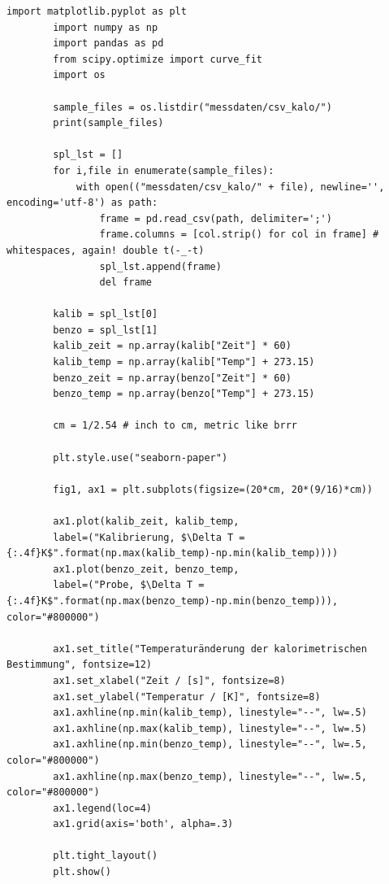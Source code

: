 	\begin{lstlisting}[style=python, caption={Zur Auswertung der kalorimetrischen Messung verwendeter Python-Code.}]
		import matplotlib.pyplot as plt
		import numpy as np
		import pandas as pd
		from scipy.optimize import curve_fit
		import os

		sample_files = os.listdir("messdaten/csv_kalo/")
		print(sample_files)

		spl_lst = []
		for i,file in enumerate(sample_files):
			with open(("messdaten/csv_kalo/" + file), newline='', encoding='utf-8') as path:
				frame = pd.read_csv(path, delimiter=';')
				frame.columns = [col.strip() for col in frame] # whitespaces, again! double t(-_-t)
				spl_lst.append(frame)
				del frame

		kalib = spl_lst[0]
		benzo = spl_lst[1]
		kalib_zeit = np.array(kalib["Zeit"] * 60)
		kalib_temp = np.array(kalib["Temp"] + 273.15)
		benzo_zeit = np.array(benzo["Zeit"] * 60)
		benzo_temp = np.array(benzo["Temp"] + 273.15)
		
		cm = 1/2.54 # inch to cm, metric like brrr

		plt.style.use("seaborn-paper")

		fig1, ax1 = plt.subplots(figsize=(20*cm, 20*(9/16)*cm))

		ax1.plot(kalib_zeit, kalib_temp,
		label=("Kalibrierung, $\Delta T = {:.4f}K$".format(np.max(kalib_temp)-np.min(kalib_temp))))
		ax1.plot(benzo_zeit, benzo_temp,
		label=("Probe, $\Delta T = {:.4f}K$".format(np.max(benzo_temp)-np.min(benzo_temp))), color="#800000")

		ax1.set_title("Temperaturänderung der kalorimetrischen Bestimmung", fontsize=12)
		ax1.set_xlabel("Zeit / [s]", fontsize=8)
		ax1.set_ylabel("Temperatur / [K]", fontsize=8)
		ax1.axhline(np.min(kalib_temp), linestyle="--", lw=.5)
		ax1.axhline(np.max(kalib_temp), linestyle="--", lw=.5)
		ax1.axhline(np.min(benzo_temp), linestyle="--", lw=.5, color="#800000")
		ax1.axhline(np.max(benzo_temp), linestyle="--", lw=.5, color="#800000")
		ax1.legend(loc=4)
		ax1.grid(axis='both', alpha=.3)

		plt.tight_layout()
		plt.show()
	\end{lstlisting}
	\clearpage
